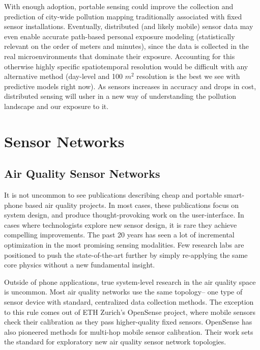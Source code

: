 With enough adoption, portable sensing could improve the collection and prediction of city-wide pollution mapping traditionally associated with fixed sensor installations.  Eventually, distributed (and likely mobile) sensor data may even enable accurate path-based personal exposure modeling (statistically relevant on the order of meters and minutes), since the data is collected in the real microenvironments that dominate their exposure.  Accounting for this otherwise highly specific spatiotemporal resolution would be difficult with any alternative method (day-level and 100 \(m^2\) resolution is the best we see with predictive models right now).  As sensors increases in accuracy and drops in cost, distributed sensing will usher in a new way of understanding the pollution landscape and our exposure to it.


\section{Sensor Networks}

\subsection{Air Quality Sensor Networks}

It is not uncommon to see publications describing cheap and portable smart-phone based air quality projects. \cite{cheng2014, haze2013}  In most cases, these publications focus on system design, and produce thought-provoking work on the user-interface. \cite{dutta2009}  In cases where technologists explore new sensor design, it is rare they achieve compelling improvements.  The past 20 years has seen a lot of incremental optimization in the most promising sensing modalities.  Few research labs are positioned to push the state-of-the-art further by simply re-applying the same core physics without a new fundamental insight.  

Outside of phone applications, true system-level research in the air quality space is uncommon.  Most air quality networks use the same topology-- one type of sensor device with standard, centralized data collection methods.  The exception to this rule comes out of ETH Zurich's OpenSense project, where mobile sensors check their calibration as they pass higher-quality fixed sensors.  \cite{hasen2011}  OpenSense has also pioneered methods for multi-hop mobile sensor calibration.  Their work sets the standard for exploratory new air quality sensor network topologies.

